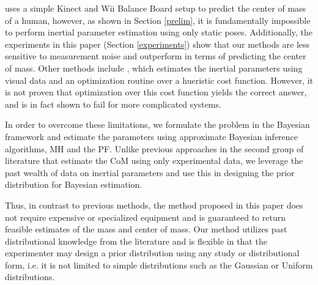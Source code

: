 \cite{gonzalez2012estimation} uses a simple Kinect and Wii Balance Board setup to predict the center of mass of a human, however, as shown in Section \ref{prelim}, it is fundamentally impossible to perform inertial parameter estimation using only static poses. 
Additionally, the experiments in this paper (Section \ref{experiments}) show that our methods are less sensitive to measurement noise and outperform \cite{gonzalez2012estimation} in terms of predicting the center of mass.
Other methods include \cite{zhao2010estimating}, which estimates the inertial parameters using visual data and an optimization routine over a hueristic cost function. However, it is not proven that optimization over this cost function yields the correct answer, and is in fact shown to fail for more complicated systems. 

In order to overcome these limitations, we formulate the problem in the Bayesian framework and estimate the parameters using approximate Bayesian inference algorithms, MH and the PF. Unlike previous approaches in the second group of literature that estimate the CoM using only experimental data, we leverage the past wealth of data on inertial parameters \cite{mcconville1980anthropometric, armstrong1988anthropometry, jensen1986body, jensen1989changes} and use this in designing the prior distribution for Bayesian estimation. 

Thus, in contrast to previous methods, the method proposed in this paper does not require expensive or specialized equipment and is guaranteed to return feasible estimates of the mass and center of mass.
Our method utilizes past distributional knowledge from the literature and is flexible in that the experimenter may design a prior distribution using any study or distributional form, i.e. it is not limited to simple distributions such as the Gaussian or Uniform distributions.


